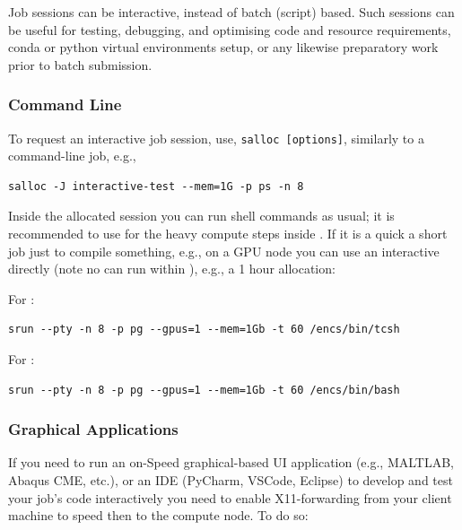 
Job sessions can be interactive, instead of batch (script) based. Such 
sessions can be useful for testing, debugging, and optimising code and resource 
requirements, conda or python virtual environments setup, or any likewise
preparatory work prior to batch submission.

\subsubsection{Command Line}

To request an interactive job 
session, use, \texttt{salloc [options]}, similarly to a 
 command-line job, e.g.,
%
\begin{verbatim}
salloc -J interactive-test --mem=1G -p ps -n 8
\end{verbatim}
%
%
Inside the allocated  session you can run shell
commands as usual; it is recommended to use  for
the heavy compute steps inside .
%
If it is a quick a short job just to compile something, e.g., on
a GPU node you can use an interactive  directly
(note no  can run within ), e.g., a 1 hour
allocation:

For :
\begin{verbatim}
srun --pty -n 8 -p pg --gpus=1 --mem=1Gb -t 60 /encs/bin/tcsh
\end{verbatim}

For :
\begin{verbatim}
srun --pty -n 8 -p pg --gpus=1 --mem=1Gb -t 60 /encs/bin/bash
\end{verbatim}

\subsubsection{Graphical Applications}

If you need to run an on-Speed graphical-based UI application (e.g., MALTLAB,
Abaqus CME, etc.), or an IDE (PyCharm, VSCode, Eclipse)
to develop and test your job's code interactively you need to enable
X11-forwarding from your client machine to speed then to the compute node.
To do so:

